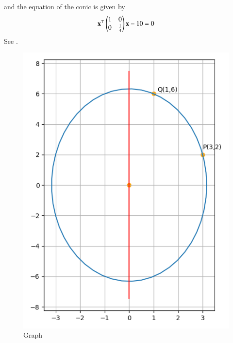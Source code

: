 and the equation of the conic is given by
\begin{align}
\boldsymbol{\mathbf{x}}^\top\begin{pmatrix}1&0\\0&\frac{1}{4}\end{pmatrix}\boldsymbol{\mathbf{x}} - 10 = 0
\end{align}
See  
.
\begin{figure}[ht]
\centering
\includegraphics[width = \columnwidth]{chapters/11/11/3/19/figs/fig1.png}
\caption{Graph}
\label{fig:chapters/11/11/3/19/1}
\end{figure}

